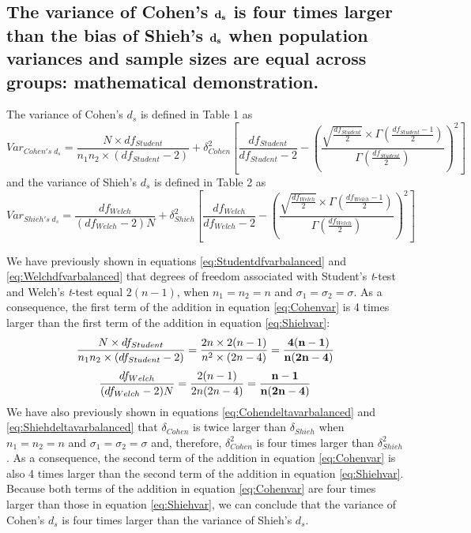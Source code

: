 \documentclass[
  english,
  man,floatsintext]{apa6}
\begin{document}
\begin{appendix}
{\subsection{\texorpdfstring{The variance of Cohen's \(\bf d_s\) is four
times larger than the bias of Shieh's \(\bf d_s\) when population
variances and sample sizes are equal across groups: mathematical
demonstration.}{The variance of Cohen's \textbackslash bf d\_s is four times larger than the bias of Shieh's \textbackslash bf d\_s when population variances and sample sizes are equal across groups: mathematical demonstration.}}\label{the-variance-of-cohens-bf-d_s-is-four-times-larger-than-the-bias-of-shiehs-bf-d_s-when-population-variances-and-sample-sizes-are-equal-across-groups-mathematical-demonstration.}}

The variance of Cohen's \(d_s\) is defined in Table 1 as
\begin{equation}
Var_{Cohen's \; d{_s}}=\frac{N\times df_{Student}}{n_1n_2 \times (df_{Student}-2)} + \delta^2_{Cohen} \left[ \frac{df_{Student}}{df_{Student}-2} - \left( \frac{\sqrt{\frac{df_{Student}}{2}} \times \Gamma{\left(\frac{df_{Student}-1}{2}\right)}}{\Gamma{\left( \frac{df_{Student}}{2}\right)}} \right)^2\right]
\label{eq:Cohenvar}
\end{equation} and the variance of Shieh's \(d_s\) is defined in Table 2
as \begin{equation}
Var_{Shieh's \; d{_s}}=\frac{df_{Welch}}{(df_{Welch}-2)N}  + \delta^2_{Shieh} \left[ \frac{df_{Welch}}{df_{Welch}-2} - \left( \frac{\sqrt{\frac{df_{Welch}}{2}} \times \Gamma{\left(\frac{df_{Welch}-1}{2}\right)}}{\Gamma{\left( \frac{df_{Welch}}{2}\right)}} \right)^2 \right]
\label{eq:Shiehvar}
\end{equation}

We have previously shown in equations \ref{eq:Studentdfvarbalanced} and
\ref{eq:Welchdfvarbalanced} that degrees of freedom associated with
Student's \emph{t}-test and Welch's \emph{t}-test equal \(2(n-1)\), when
\(n_1=n_2=n\) and \(\sigma_1=\sigma_2=\sigma\). As a consequence, the
first term of the addition in equation \ref{eq:Cohenvar} is 4 times
larger than the first term of the addition in equation
\ref{eq:Shiehvar}:
\[\frac{N\times df_{Student}}{n_1n_2 \times (df_{Student}-2)}=\frac{2n\times 2(n-1)}{n^2 \times (2n-4)} =\bf \frac{4(n-1)}{n(2n-4)}\]
\[\frac{df_{Welch}}{(df_{Welch}-2)N} = \frac{2(n-1)}{2n(2n-4)}= \bf \frac{n-1}{n(2n-4)}\]
We have also previously shown in equations
\ref{eq:Cohendeltavarbalanced} and \ref{eq:Shiehdeltavarbalanced} that
\(\delta_{Cohen}\) is twice larger than \(\delta_{Shieh}\) when
\(n_1=n_2=n\) and \(\sigma_1=\sigma_2=\sigma\) and, therefore,
\(\delta^2_{Cohen}\) is four times larger than \(\delta^2_{Shieh}\). As
a consequence, the second term of the addition in equation
\ref{eq:Cohenvar} is also 4 times larger than the second term of the
addition in equation \ref{eq:Shiehvar}. Because both terms of the
addition in equation \ref{eq:Cohenvar} are four times larger than those
in equation \ref{eq:Shiehvar}, we can conclude that the variance of
Cohen's \(d_s\) is four times larger than the variance of Shieh's
\(d_s\).
\end{appendix}
\end{document}
